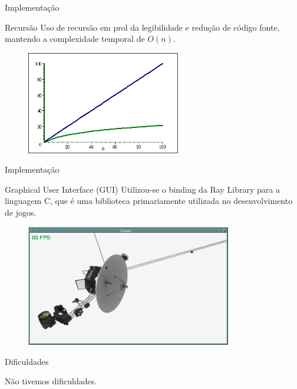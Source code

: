 \documentclass[11pt]{beamer}
\begin{document}
\begin{frame}{Implementação}
    \begin{block}{Recursão}
        Uso de recursão em prol da legibilidade e redução de código fonte, mantendo a complexidade temporal de $O(n)$.
    \end{block}

    \begin{figure}[htb]
        \centering
        \includegraphics[width=0.6\textwidth]{imagens/time.png}
    \end{figure}
    
\end{frame}

\begin{frame}{Implementação}
    \begin{block}{Graphical User Interface (GUI)}
        Utilizou-se o binding da Ray Library para a linguagem C, que é uma biblioteca primariamente utilizada no desenvolvimento de jogos.
    \end{block}

    \begin{figure}[htb]
        \centering
        \includegraphics[width=0.8\textwidth]{imagens/rayexample.png}
    \end{figure}
    
\end{frame}

\begin{frame}{Dificuldades}
    \begin{center}
        Não tivemos dificuldades.
    \end{center}
\end{frame}
\end{document}
